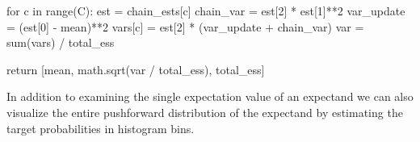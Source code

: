 \documentclass[
  letterpaper,
  DIV=11,
  numbers=noendperiod]{scrartcl}
\newenvironment{Shaded}{\begin{snugshade}}{\end{snugshade}}
\newcommand{\BuiltInTok}[1]{\textcolor[rgb]{0.00,0.23,0.31}{#1}}
\newcommand{\ControlFlowTok}[1]{\textcolor[rgb]{0.00,0.23,0.31}{#1}}
\newcommand{\DecValTok}[1]{\textcolor[rgb]{0.68,0.00,0.00}{#1}}
\newcommand{\KeywordTok}[1]{\textcolor[rgb]{0.00,0.23,0.31}{#1}}
\newcommand{\NormalTok}[1]{\textcolor[rgb]{0.00,0.23,0.31}{#1}}
\newcommand{\OperatorTok}[1]{\textcolor[rgb]{0.37,0.37,0.37}{#1}}
\begin{document}
\begin{Shaded}
\begin{Highlighting}[]
  \ControlFlowTok{for}\NormalTok{ c }\KeywordTok{in} \BuiltInTok{range}\NormalTok{(C):}
\NormalTok{    est }\OperatorTok{=}\NormalTok{ chain\_ests[c]}
\NormalTok{    chain\_var }\OperatorTok{=}\NormalTok{ est[}\DecValTok{2}\NormalTok{] }\OperatorTok{*}\NormalTok{ est[}\DecValTok{1}\NormalTok{]}\OperatorTok{**}\DecValTok{2}
\NormalTok{    var\_update }\OperatorTok{=}\NormalTok{ (est[}\DecValTok{0}\NormalTok{] }\OperatorTok{{-}}\NormalTok{ mean)}\OperatorTok{**}\DecValTok{2}
    \BuiltInTok{vars}\NormalTok{[c] }\OperatorTok{=}\NormalTok{ est[}\DecValTok{2}\NormalTok{] }\OperatorTok{*}\NormalTok{ (var\_update }\OperatorTok{+}\NormalTok{ chain\_var)}
\NormalTok{  var }\OperatorTok{=} \BuiltInTok{sum}\NormalTok{(}\BuiltInTok{vars}\NormalTok{) }\OperatorTok{/}\NormalTok{ total\_ess}

  \ControlFlowTok{return}\NormalTok{ [mean, math.sqrt(var }\OperatorTok{/}\NormalTok{ total\_ess), total\_ess]}
\end{Highlighting}
\end{Shaded}

In addition to examining the single expectation value of an expectand we
can also visualize the entire pushforward distribution of the expectand
by estimating the target probabilities in histogram bins.
\end{document}
